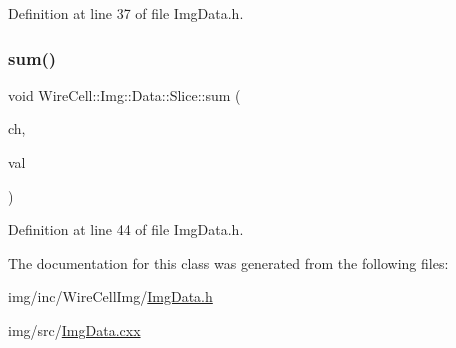 Definition at line 37 of file Img\+Data.\+h.

\mbox{\label{class_wire_cell_1_1_img_1_1_data_1_1_slice_af68a6a88e7af9a3d478e817c0a3bfe15}} 
\subsubsection{\texorpdfstring{sum()}{sum()}}
{\footnotesize\ttfamily void Wire\+Cell\+::\+Img\+::\+Data\+::\+Slice\+::sum (\begin{DoxyParamCaption}\item[{const \hyperlink{class_wire_cell_1_1_i_data_aff870b3ae8333cf9265941eef62498bc}{I\+Channel\+::pointer} \&}]{ch,  }\item[{\hyperlink{class_wire_cell_1_1_i_slice_a9d6f136d407740183a2c4d2078745a59}{value\+\_\+t}}]{val }\end{DoxyParamCaption})\hspace{0.3cm}{\ttfamily [inline]}}



Definition at line 44 of file Img\+Data.\+h.



The documentation for this class was generated from the following files\+:\begin{DoxyCompactItemize}
\item 
img/inc/\+Wire\+Cell\+Img/\hyperlink{_img_data_8h}{Img\+Data.\+h}\item 
img/src/\hyperlink{_img_data_8cxx}{Img\+Data.\+cxx}\end{DoxyCompactItemize}
